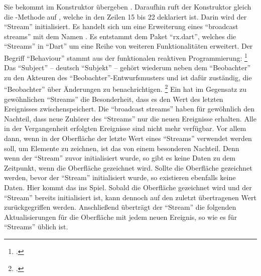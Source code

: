 Sie bekommt  im Konstruktor übergeben .
Daraufhin ruft der Konstruktor gleich die -Methode auf , welche in den Zeilen 15 bis 22 deklariert ist.
Darin wird der \enquote{Stream}   initialisiert.
Es handelt sich um eine Erweiterung eines \enquote{broadcast streams} mit dem Namen  .
Es entstammt dem Paket \enquote{rx.dart},
welches die \enquote{Streams} in \enquote{Dart} um eine Reihe von weiteren Funktionalitäten erweitert.
Der Begriff \enquote{Behaviour} stammt aus der funktionalen reaktiven Programmierung:
\footcite[][S. 1]{ElliottHudak97:Fran}
Das \enquote{Subject}
-- deutsch \enquote{Subjekt} --
gehört wiederum neben dem \enquote{Beobachter} zu den Akteuren des \enquote{Beobachter}-Entwurfsmusters
und ist dafür zuständig, die \enquote{Beobachter} über Änderungen zu benachrichtigen.
\footcite[Vgl.][S. 288]{gamma2009entwurfsmuster}
Ein  hat im Gegensatz zu gewöhnlichen \enquote{Streams} die Besonderheit,
dass es den Wert des letzten Ereignisses zwischenspeichert.
Die \enquote{broadcast streams} haben für gewöhnlich den Nachteil,
dass neue Zuhörer des \enquote{Streams} nur die neuen Ereignisse erhalten.
Alle in der Vergangenheit erfolgten Ereignisse sind nicht mehr verfügbar.
Vor allem dann,
wenn in der Oberfläche der letzte Wert eines \enquote{Streams} verwendet werden soll,
um Elemente zu zeichnen,
ist das von einem besonderen Nachteil.
Denn wenn der \enquote{Stream} zuvor initialisiert wurde,
so gibt es keine Daten zu dem Zeitpunkt,
wenn die Oberfläche gezeichnet wird.
Sollte die Oberfläche gezeichnet werden,
bevor der \enquote{Stream} initialisiert wurde,
so  existieren ebenfalls keine Daten.
Hier kommt das  ins Spiel.
Sobald die Oberfläche gezeichnet wird und der \enquote{Stream} bereits initialisiert ist,
kann dennoch auf den zuletzt übertragenen Wert zurückgegriffen werden.
Anschließend überträgt der \enquote{Stream} die folgenden Aktualisierungen für die Oberfläche mit jedem neuen Ereignis,
so wie es für \enquote{Streams} üblich ist.

